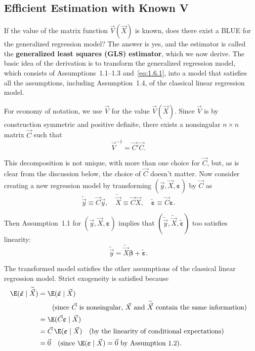 \subsection*{Efficient Estimation with Known V}

If the value of the matrix function $\vec{V}(\vec{X})$ is known, does there exist a
BLUE for the generalized regression model?  The answer is yes, and the estimator is
called the \textbf{generalized least squares (GLS) estimator}, which we now derive.
The basic idea of the derivation is to transform the generalized regression model,
which consists of Assumptions~1.1--1.3 and~\eqref{eq:1.6.1}, into a model that
satisfies all the assumptions, including Assumption~1.4, of the classical linear
regression model.

For economy of notation, we use $\vec{V}$ for the value $\vec{V}(\vec{X})$.  Since
$\vec{V}$ is by construction symmetric and positive definite, there exists a nonsingular
$n \times n$ matrix $\vec{C}$ such that
%
\begin{equation}
  \vec{V}^{-1} = \vec{C}'\vec{C}.
  \label{eq:1.6.2}
\end{equation}

This decomposition is not unique, with more than one choice for $\vec{C}$, but, as is
clear from the discussion below, the choice of $\vec{C}$ doesn't matter.  Now consider
creating a new regression model by transforming $(\vec{y}, \vec{X}, \bm{\varepsilon})$
by $\vec{C}$ as
%
\begin{equation}
  \tilde{\vec{y}} \equiv \vec{C}\vec{y}, \quad
  \widetilde{\vec{X}} \equiv \vec{C}\vec{X}, \quad
  \tilde{\bm{\varepsilon}} \equiv \vec{C}\bm{\varepsilon}.
  \label{eq:1.6.3}
\end{equation}

Then Assumption~1.1 for $(\vec{y}, \vec{X}, \bm{\varepsilon})$ implies that
$(\tilde{\vec{y}}, \widetilde{\vec{X}}, \tilde{\bm{\varepsilon}})$ too satisfies
linearity:
%
\begin{equation}
  \tilde{\vec{y}} = \widetilde{\vec{X}} \bm{\beta} + \tilde{\bm{\varepsilon}}.
  \label{eq:1.6.4}
\end{equation}

The transformed model satisfies the other assumptions of the classical linear regression
model.  Strict exogeneity is satisfied because
%
\begin{align*}
  \E(\tilde{\bm{\varepsilon}} \mid \widetilde{\vec{X}})
    &= \E(\tilde{\bm{\varepsilon}} \mid \vec{X}) \\
    &\qquad \text{(since $\vec{C}$ is nonsingular, $\vec{X}$ and
      $\widetilde{\vec{X}}$ contain the same information)} \\
    &= \E(\vec{C}\bm{\varepsilon} \mid \vec{X}) \\
    &= \vec{C}\,\E(\bm{\varepsilon} \mid \vec{X})
      \quad \text{(by the linearity of conditional expectations)} \\
    &= \vec{0}
      \quad \text{(since $\E(\bm{\varepsilon} \mid \vec{X}) = \vec{0}$
        by Assumption~1.2).}
\end{align*}

